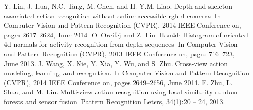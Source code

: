 \documentclass[a4paper, 10pt, conference]{ieeeconf}      %
\begin{document}
\begin{thebibliography}{99}
Y. Lin, J. Hua, N.C. Tang, M. Chen, and H.-Y.M. Liao. Depth
and skeleton associated action recognition without online accessible rgb-d cameras. In Computer Vision and Pattern Recognition (CVPR), 2014 IEEE Conference on, pages 2617–2624, June 2014. %
O. Oreifej and Z. Liu. Hon4d: Histogram of oriented 4d normals for activity
recognition from depth sequences. In Computer Vision and Pattern Recognition
(CVPR), 2013 IEEE Conference on, pages 716–723, June 2013. 
J. Wang, X. Nie, Y. Xia, Y. Wu, and S. Zhu. Cross-view action modeling, learning, and recognition. In Computer Vision and Pattern Recognition (CVPR), 2014 IEEE Conference on, pages 2649–2656, June 2014. 
F. Zhu, L. Shao, and M. Lin. Multi-view action recognition using local similarity random forests and sensor fusion. Pattern Recognition Leters, 34(1):20 – 24, 2013.


\end{thebibliography}
\end{document}
